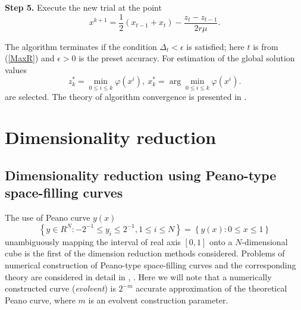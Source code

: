 \documentclass[runningheads]{llncs}
\begin{document}
\textbf{Step 5.} Execute the new trial at the point 
\begin{equation}\label{xk1}
x^{k+1}=\frac{1}{2}(x_{t-1}+x_t) - \frac{z_t-z_{t-1}}{2r\mu}.
\end{equation}

The algorithm terminates if the condition $\Delta_t<\epsilon$ is satisfied; 
here $t$ is from (\ref{MaxR}) and $\epsilon>0$ is the preset accuracy. For 
estimation of the global solution values
\[
z_k^\ast=\min_{0\leq i \leq k}\varphi(x^i), \ x_k^\ast=\arg \min_{0\leq i \leq
 k}\varphi(x^i).
\]
are selected. 
The theory of algorithm convergence is presented in \cite{Strongin2000}.

\section{Dimensionality reduction}
\subsection{Dimensionality reduction using Peano-type space-filling curves}
\label{SectionPeano}

The use of Peano curve $y(x)$ 
\begin{equation}
\left\{y\in R^N: -2^{-1}\leq y_i \leq 2^{-1}, 1 \leq i \leq N\right\}=\left\{
y(x):0\leq x \leq 1 \right\}
\end{equation}
unambiguously mapping the interval of real axis $[0,1]$ onto a 
$N$-dimensional cube is the first of the dimension reduction methods considered.
Problems of numerical construction of Peano-type space-filling curves and the 
corresponding theory are considered in detail in \cite{Strongin2000}, 
\cite{Sergeyev2013}. Here we will note that a numerically 
constructed curve (\textit{evolvent}) is $2^{-m}$ accurate approximation of 
the theoretical Peano curve, where $m$ is an evolvent construction parameter.
\end{document}
